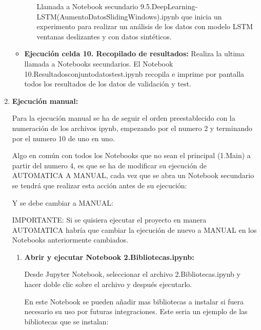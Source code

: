 \begin{enumerate}
\begin{itemize}
\begin{enumerate}
	Llamada a Notebook secundario 9.5.DeepLearning-LSTM(AumentoDatosSlidingWindows).ipynb que inicia un experimento para realizar un análisis de los datos con modelo LSTM ventanas deslizantes y con datos sintéticos.	
	\end{enumerate} 
	
   \item
   \textbf{Ejecución celda 10. Recopilado de resultados: } 	
	Realiza la ultima llamada a Notebooks secundarios. El Notebook 10.Resultadosconjuntodatostest.ipynb recopila e imprime por pantalla todos los resultados de los datos de validación y test.


	
  \end{itemize}
  
  
  
 \item \textbf{Ejecución manual:}
 
 Para la ejecución manual se ha de seguir el orden preestablecido con la numeración de los archivos ipynb, empezando por el numero 2 y terminando por el numero 10 de uno en uno. 
 
Algo en común con todos los Notebooks que no sean el principal (1.Main) a partir del numero 4, es que se ha de modificar su ejecución de AUTOMATICA A MANUAL, cada vez que se abra un Notebook secundario se tendrá que realizar esta acción antes de su ejecución:


Y se debe cambiar a MANUAL:

 
IMPORTANTE: Si se quisiera ejecutar el proyecto en manera AUTOMATICA habría que cambiar la ejecución de nuevo a MANUAL en los Notebooks anteriormente cambiados.
 
	\begin{enumerate}
	\def\labelenumi{\arabic{enumi}.}
	\tightlist
	\item 
	\textbf{Abrir y ejecutar Notebook 2.Bibliotecas.ipynb:} 
    
    Desde Jupyter Notebook, seleccionar el archivo 2.Bibliotecas.ipynb y hacer doble clic sobre el archivo y después ejecutarlo.
    
     En este Notebook se pueden añadir mas bibliotecas a instalar si fuera necesario su uso por futuras integraciones. Este seria un ejemplo de las bibliotecas que se instalan:
    

\end{enumerate}
\end{enumerate}
